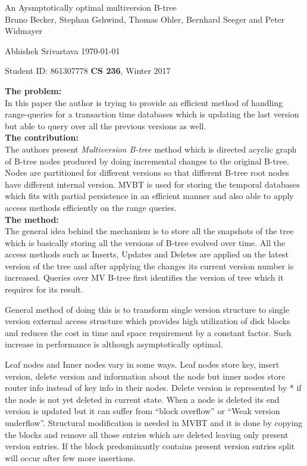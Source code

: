 \documentclass[a4paper,12pt, twoside]{article}
\renewcommand{\maketitle}{%
 	\Large
 	\begin{center}
 	An Aysmptotically optimal multiversion B-tree\\	
 	\normalsize Bruno Becker, Stephan Gshwind, Thomas Ohler, Bernhard Seeger and Peter Widmayer
 	\end{center}
 
 	\Large
	Abhishek Srivastava
	\hfill
	\normalsize
	\today
 	\par
 	Student ID: 861307778
 	\hfill
 	\textbf{CS 236}, Winter 2017
 	\par 	
 	\hrulefill
 	\par
 	}
\begin{document}
\thispagestyle{empty}
	
\maketitle
\textbf{The problem:}\\
In this paper the author is trying to provide an efficient method of handling range-queries for a transaction time databases which is updating the last version but able to query over all the previous versions as well.\\   

\textbf{The contribution:}\\
The authors present \emph{Multiversion B-tree} method which is directed acyclic graph of B-tree nodes produced by doing incremental changes to the original B-tree. Nodes are partitioned for different versions so that different B-tree root nodes have different internal version. MVBT is used for storing the temporal databases which fits with partial persistence in an efficient manner and also able to apply access methods efficiently on the range queries.\\
 
\textbf{The method:}\\
The general idea behind the mechanism is to store all the snapshots of the tree which is basically storing all the versions of B-tree evolved over time. All the access methods such as Inserts, Updates and Deletes are applied on the latest version of the tree and after applying the changes its current version number is increased. Queries over MV B-tree first identifies the version of tree which it requires for its result.  

General method of doing this is to transform single version structure to single version external access structure which provides high utilization of disk blocks and reduces the cost in time and space requirement by a constant factor. Such increase in performance is although asymptotically optimal.
 
Leaf nodes and Inner nodes vary in some ways. Leaf nodes store key, insert version, delete version and information about the node but inner nodes store router info instead of key info in their nodes. Delete version is represented by * if the node is not yet deleted in current state. When a node is deleted its end version is updated but it can suffer from ``block overflow'' or ``Weak version underflow''. Structural modification is needed in MVBT and it is done by copying the blocks and remove all those entries which are deleted leaving only present version entries. If the block predominantly contains present version entries split will occur after few more insertions. 
\end{document}
